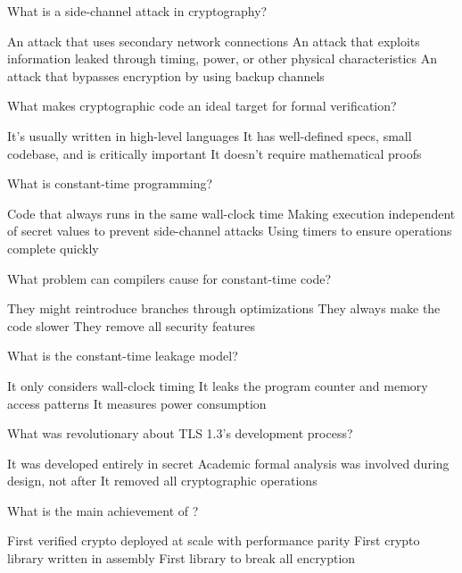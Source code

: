\documentclass[10pt,a4paper,american]{exam}
\begin{document}
\begin{questions}
	\question What is a side-channel attack in cryptography?
	\begin{randomizechoices}
		\choice An attack that uses secondary network connections
		\CorrectChoice An attack that exploits information leaked through timing, power, or other physical characteristics
		\choice An attack that bypasses encryption by using backup channels
	\end{randomizechoices}

	\question What makes cryptographic code an ideal target for formal verification?
	\begin{randomizechoices}
		\choice It's usually written in high-level languages
		\CorrectChoice It has well-defined specs, small codebase, and is critically important
		\choice It doesn't require mathematical proofs
	\end{randomizechoices}

	\question What is constant-time programming?
	\begin{randomizechoices}
		\choice Code that always runs in the same wall-clock time
		\CorrectChoice Making execution independent of secret values to prevent side-channel attacks
		\choice Using timers to ensure operations complete quickly
	\end{randomizechoices}

	\question What problem can compilers cause for constant-time code?
	\begin{randomizechoices}
		\CorrectChoice They might reintroduce branches through optimizations
		\choice They always make the code slower
		\choice They remove all security features
	\end{randomizechoices}

	\question What is the constant-time leakage model?
	\begin{randomizechoices}
		\choice It only considers wall-clock timing
		\CorrectChoice It leaks the program counter and memory access patterns
		\choice It measures power consumption
	\end{randomizechoices}

	\question What was revolutionary about TLS 1.3's development process?
	\begin{randomizechoices}
		\choice It was developed entirely in secret
		\CorrectChoice Academic formal analysis was involved during design, not after
		\choice It removed all cryptographic operations
	\end{randomizechoices}

	\question What is the main achievement of \haclstar?
	\begin{randomizechoices}
		\CorrectChoice First verified crypto deployed at scale with performance parity
		\choice First crypto library written in assembly
		\choice First library to break all encryption
	\end{randomizechoices}


\end{questions}
\end{document}
